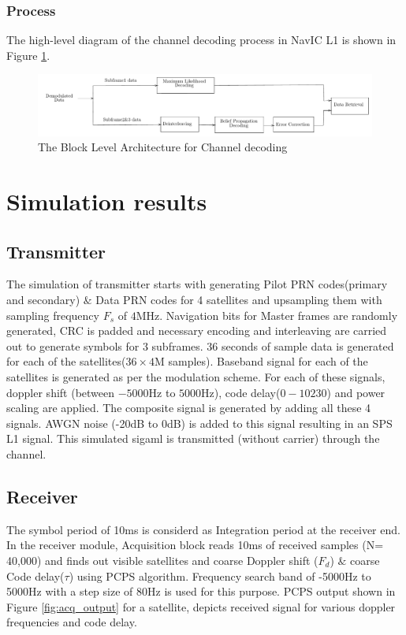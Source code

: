 \documentclass[conference]{IEEEtran}
\begin{document}
\subsubsection{Process}
The high-level diagram of the channel decoding process in NavIC L1 is shown in Figure 
\ref{fig:decoding_r}.
\begin{normalsize}
\begin{figure}[ht]
\centering
\includegraphics[width=1\columnwidth]{figs/decoding_r}
\centering
\caption{The Block Level Architecture for Channel decoding}
\label{fig:decoding_r}
\end{figure}
\end{normalsize}

\section {Simulation results}
\subsection{Transmitter}
The simulation of transmitter starts with generating Pilot PRN codes(primary and secondary) $\&$ 
Data PRN codes for 4 satellites and upsampling them with sampling frequency $F_s$ of $4$MHz.  
Navigation bits for Master frames are randomly generated, CRC is padded and necessary encoding and 
interleaving are carried out to generate symbols for $3$ subframes. $36$ seconds of sample data 
is generated for each of the satellites($36\times4$M samples). Baseband signal for each of the 
satellites is generated as per the modulation scheme. For each of these signals, doppler shift 
(between $-5000$Hz to $5000$Hz), code delay($0-10230$) and power scaling are applied. 
The composite signal is generated by adding all these 4 signals. AWGN noise (-20dB to 0dB) is added
to this signal resulting in an SPS L1 signal. This simulated sigaml is transmitted (without carrier)
through the channel.
\subsection{Receiver}
The symbol period of 10ms is considerd as Integration period at the receiver end. In the receiver 
module, Acquisition block reads 10ms of received samples (N= 40,000) and finds out visible 
satellites and coarse Doppler shift ($F_d$) $\&$ coarse Code delay($\tau$) using PCPS algorithm. 
Frequency search band of -5000Hz to 5000Hz with a step size of 80Hz is used for this purpose.  
PCPS output shown in Figure \ref{fig:acq_output} for a satellite, depicts received signal for 
various doppler frequencies and code delay. 
\end{document}
